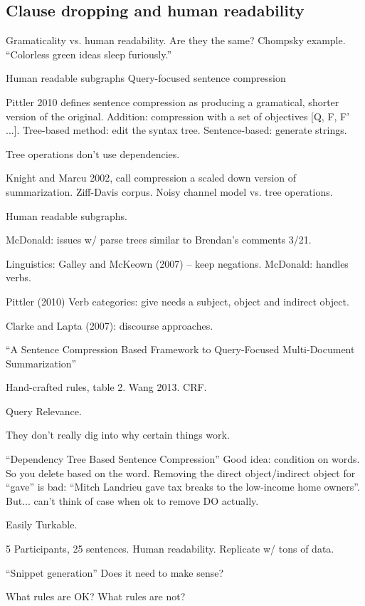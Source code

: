 \documentclass[11pt]{article}
\begin{document}
\subsection{Clause dropping and human readability}

Gramaticality vs. human readability. Are they the same? Chompsky example. ``Colorless green ideas sleep furiously.''

Human readable subgraphs
Query-focused sentence compression

Pittler 2010 defines sentence compression as producing a gramatical, shorter version of the original. Addition: compression with a set of objectives [Q, F, F' ...]. Tree-based method: edit the syntax tree. Sentence-based: generate strings.

Tree operations don't use dependencies.

Knight and Marcu 2002, call compression a scaled down version of summarization. Ziff-Davis corpus. Noisy channel model vs. tree operations.

Human readable subgraphs.

McDonald: issues w/ parse trees similar to Brendan's comments 3/21.

Linguistics: Galley and McKeown (2007) -- keep negations. McDonald: handles verbs.

Pittler (2010) Verb categories: give needs a subject, object and indirect object.

Clarke and Lapta (2007): discourse approaches. 

``A Sentence Compression Based Framework to Query-Focused
Multi-Document Summarization''

Hand-crafted rules, table 2. Wang 2013. CRF.

Query Relevance.

They don't really dig into why certain things work.

``Dependency Tree Based Sentence Compression''
Good idea: condition on words. So you delete based on the word. Removing the direct object/indirect object for ``gave''
is bad: ``Mitch Landrieu gave tax breaks to the low-income home owners''. But... can't think of case when ok to remove DO actually. 

Easily Turkable.

5 Participants, 25 sentences. Human readability. Replicate w/ tons of data.

``Snippet generation''
Does it need to make sense?

What rules are OK? What rules are not? 
\end{document}

